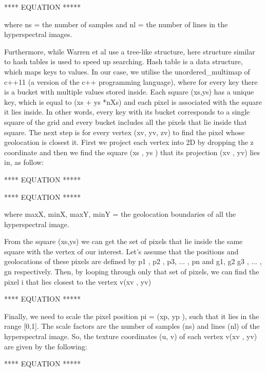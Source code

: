 \documentclass{subfiles}
\begin{document}
	**** EQUATION *****
	
	\par where ns = the number of samples and
	nl = the number of lines in the hyperspectral images.
	
	\par Furthermore, while Warren et al use a tree-like structure, here  structure similar to hash tables is used to speed up searching. Hash table is a data structure, which maps keys to values. In our case, we utilise the unordered\_multimap of c++11 (a version of the c++ programming language), where for every key there is a bucket with multiple values stored inside. Each square (xs,ys)	has a unique key, which is equal to (xs + ys *nXs) and each pixel is associated with the square it lies inside. In other words, every key with its bucket corresponds to a single square of the grid and every bucket includes all the pixels that lie inside that square. The next step is for every vertex (xv, yv, zv) to find the pixel whose geolocation is closest it. First we project each vertex into 2D by dropping the z coordinate and then we find the square (xs , ys ) that its projection (xv , yv) lies in, as follow:
	
	**** EQUATION *****
	
	**** EQUATION *****
	\par where maxX, minX, maxY, minY = the geolocation boundaries of all the hyperspectral image.
	
	\par From the square (xs,ys) we can get the set of pixels that lie inside the same square with the vertex of our interest. Let’s assume that the positions and geolocations of these pixels are defined by p1	, p2 , p3, ... , pn and g1, g2 g3 , ... , gn respectively. Then, by looping through only that set of pixels, we can find the pixel i that lies closest to the vertex v(xv , yv)
	
	**** EQUATION *****
	
	\par Finally, we need to scale the pixel position pi = (xp, yp ), such that it lies in the range [0,1]. The scale factors are the number of samples (ns) and lines (nl) of the hyperspectral image. So, the texture coordinates (u, v) of each vertex v(xv , yv) are given by the following:
	
	
		**** EQUATION *****
	
	
		
		
	
	
	
	

	
		

	
\end{document}
